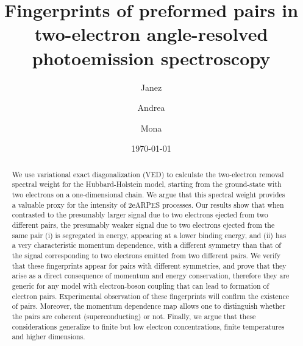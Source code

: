\documentclass[prl,twocolumn,showpacs,amsmath,amssymb,superscriptaddress,floatfix]{revtex4}
\begin{document}
\title{Fingerprints of preformed pairs  in two-electron angle-resolved photoemission spectroscopy}

\author{Janez }

\author{Andrea }

\author{Mona }

\date{\today}
\begin{abstract}
We use variational exact diagonalization (VED) to
calculate the two-electron removal spectral weight for the Hubbard-Holstein model, starting from the ground-state with two electrons on a one-dimensional chain. We argue that this spectral weight provides a valuable proxy for the intensity of 2eARPES processes. Our results show that when contrasted to the presumably larger signal due to two electrons ejected from two different pairs, the presumably weaker signal due to two electrons ejected from the same pair  (i) is segregated in energy, appearing at a lower binding energy, and (ii) has a very characteristic momentum dependence, with a different symmetry than that of the signal corresponding to two electrons emitted from two different pairs. We verify that these fingerprints appear for pairs with different symmetries, and prove that they arise as a direct consequence of momentum and energy conservation, therefore they are generic for any model with electron-boson coupling that can lead to formation of electron pairs. Experimental observation of these fingerprints will confirm the existence of pairs. Moreover, the momentum dependence map allows one to distinguish whether the pairs are coherent (superconducting) or not. Finally, we argue that these considerations generalize to finite but low electron concentrations, finite temperatures and higher dimensions.
\end{abstract}


\maketitle
\end{document}
